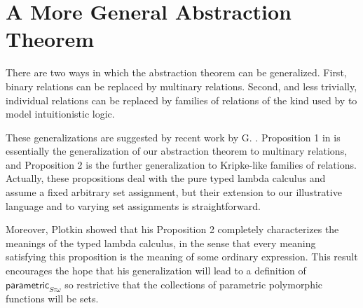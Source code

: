 \documentclass[sigplan,screen,nonacm,balance=false]{acmart}
\theoremstyle{plain}
\newcommand{\para}{\mathsf{parametric}}
\begin{document}
\section{A More General Abstraction Theorem} \label{sec:gen-abs}

There are two ways in which the abstraction theorem can be generalized.
First, binary relations can be replaced by multinary relations.
Second, and less trivially, individual relations can be replaced by families of relations of the kind used by \citet{intuitionistic} to model intuitionistic logic.

These generalizations are suggested by recent work by G. \citet{definability}.
Proposition 1 in \citep{definability} is essentially the generalization of our abstraction theorem to multinary relations, and Proposition 2 is the further generalization to Kripke-like families of relations.
Actually, these propositions deal with the pure typed lambda calculus and assume a fixed arbitrary set assignment, but their extension to our illustrative language and to varying set assignments is straightforward.

Moreover, Plotkin showed that his Proposition 2 completely characterizes the meanings of the typed lambda calculus, in the sense that every meaning satisfying this proposition is the meaning of some ordinary expression.
This result encourages the hope that his generalization will lead to a definition of $\para_{S \tau \omega}$ so restrictive that the collections of parametric polymorphic functions will be sets.
\end{document}
